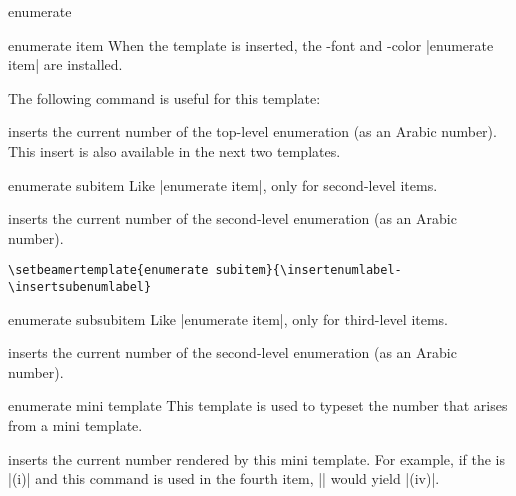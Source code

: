 \begin{environment}{{enumerate}}
\begin{element}{enumerate item}
    When the template is inserted, the \beamer-font and -color |enumerate item| are installed.

    The following command is useful for this template:
    \begin{templateinserts}
      \iteminsert{\insertenumlabel}
      inserts the current number of the top-level enumeration (as an Arabic number). This insert is also available in the next two templates.
    \end{templateinserts}
  \end{element}

  \begin{element}{enumerate subitem}\yes\yes\yes
    Like |enumerate item|, only for second-level items.

    \begin{templateinserts}
      \iteminsert{\insertsubenumlabel}
      inserts the current number of the second-level enumeration (as an Arabic number).
    \end{templateinserts}

    \example
\begin{verbatim}
\setbeamertemplate{enumerate subitem}{\insertenumlabel-\insertsubenumlabel}
\end{verbatim}
  \end{element}

  \begin{element}{enumerate subsubitem}\yes\yes\yes
    Like |enumerate item|, only for third-level items.

    \begin{templateinserts}
      \iteminsert{\insertsubsubenumlabel}
      inserts the current number of the second-level enumeration (as an Arabic number).
    \end{templateinserts}
  \end{element}

  \begin{element}{enumerate mini template}\yes\yes\yes
    This template is used to typeset the number that arises from a mini template.

    \begin{templateinserts}
      \iteminsert{\insertenumlabel}
      inserts the current number rendered by this mini template. For example, if the  is |(i)| and this command is used in the fourth item, |\insertenumlabel| would yield |(iv)|.
    \end{templateinserts}
  \end{element}
\end{environment}

